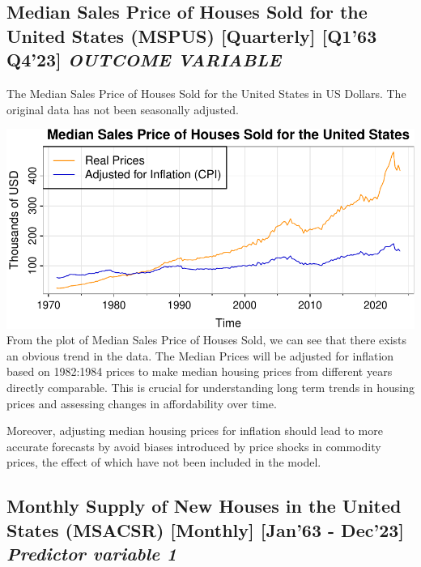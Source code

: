 \documentclass[
  man]{apa6}
\begin{document}
\subsection{\texorpdfstring{Median Sales Price of Houses Sold for the United States (MSPUS) {[}Quarterly{]} {[}Q1'63 Q4'23{]} \emph{OUTCOME VARIABLE}}{Median Sales Price of Houses Sold for the United States (MSPUS) {[}Quarterly{]} {[}Q1'63 Q4'23{]} OUTCOME VARIABLE}}\label{median-sales-price-of-houses-sold-for-the-united-states-mspus-quarterly-q163-q423-outcome-variable}

The Median Sales Price of Houses Sold for the United States in US Dollars. The original data has not been seasonally adjusted.

\includegraphics{STAT429Report---Copy_files/figure-latex/unnamed-chunk-2-1.pdf}
From the plot of Median Sales Price of Houses Sold, we can see that there exists an obvious trend in the data. The Median Prices will be adjusted for inflation based on 1982:1984 prices to make median housing prices from different years directly comparable. This is crucial for understanding long term trends in housing prices and assessing changes in affordability over time.

Moreover, adjusting median housing prices for inflation should lead to more accurate forecasts by avoid biases introduced by price shocks in commodity prices, the effect of which have not been included in the model.

\subsection{\texorpdfstring{Monthly Supply of New Houses in the United States (MSACSR) {[}Monthly{]} {[}Jan'63 - Dec'23{]} \emph{Predictor variable 1}}{Monthly Supply of New Houses in the United States (MSACSR) {[}Monthly{]} {[}Jan'63 - Dec'23{]} Predictor variable 1}}\label{monthly-supply-of-new-houses-in-the-united-states-msacsr-monthly-jan63---dec23-predictor-variable-1}
\end{document}
